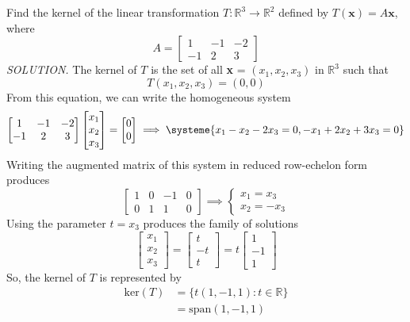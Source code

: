 \documentclass{article}
\newcommand\R{\mathbb{R}}
\begin{document}
    Find the kernel of the linear transformation $T: \R^3  \to \R^2 $ defined by $T( \textbf{x} ) = A \textbf{x}$, where
    \[A = \begin{bmatrix}
        1 & -1 & -2 \\
        -1 & 2 & 3
    \end{bmatrix}\]
    \textit{\textcolor{blue5}{SOLUTION.}} The kernel of $T$ is the set of all \textbf{x} = $(x_1, x_2, x_3)$ in $ \R^3 $ such that 
    \[T(x_1, x_2, x_3) = (0,0)\]
    From this equation, we can write the homogeneous system
    \[\begin{bmatrix}
        1 & -1 & -2 \\
        -1 & 2 & 3
    \end{bmatrix} \begin{bmatrix}
        x_1 \\ x_2 \\ x_3
    \end{bmatrix} = \begin{bmatrix}
        0 \\ 0 
    \end{bmatrix} 
    \implies \systeme {
        x_1 - x_2 - 2x_3 = 0,
        -x_1 + 2x_2 + 3x_3 = 0
    }\]
    Writing the augmented matrix of this system in reduced row-echelon form produces
    \[ \begin{bmatrix}
        1 & 0 & -1 & 0\\
        0 & 1 & 1 & 0
    \end{bmatrix} \implies
    \begin{cases}{}
        x_1 = x_3 \\
        x_2 = -x_3
    \end{cases}    \]
    Using the parameter $t = x_3$ produces the family of solutions
    \[ \begin{bmatrix}
    x_1 \\ x_2 \\ x_3 
    \end{bmatrix} =  \begin{bmatrix}
        t \\ -t \\ t
    \end{bmatrix} = t\begin{bmatrix}
        1 \\ -1 \\ 1
    \end{bmatrix} \]
    So, the kernel of $T$ is represented by
    \begin{equation*}
        \begin{split}
            \text{ker}(T) &= \{t(1,-1,1): t \in \R \} \\
                          &= \text{span}{(1,-1,1)}
        \end{split}
    \end{equation*}
\end{document}
